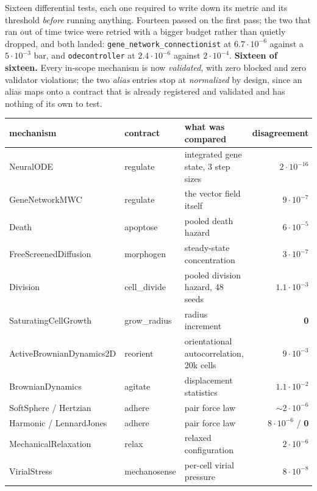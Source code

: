 \documentclass[11pt,a4paper]{article}
\newcommand{\code}[1]{\texttt{#1}}
\begin{document}
Sixteen differential tests, each one required to write down its metric and its threshold
\emph{before} running anything. Fourteen passed on the first pass; the two that ran out of time
twice were retried with a bigger budget rather than quietly dropped, and both landed:
\code{gene\_network\_connectionist} at $6.7{\cdot}10^{-6}$ against a $5{\cdot}10^{-3}$ bar, and
\code{odecontroller} at $2.4{\cdot}10^{-6}$ against $2{\cdot}10^{-4}$. \textbf{Sixteen of
sixteen.} Every in-scope mechanism is now \emph{validated}, with zero blocked and zero validator
violations; the two \emph{alias} entries stop at \emph{normalized} by design, since an alias maps
onto a contract that is already registered and validated and has nothing of its own to test.

\begin{center}
\footnotesize
\begin{tabular}{@{}l l l r@{}}
\toprule
\textbf{mechanism} & \textbf{contract} & \textbf{what was compared} & \textbf{disagreement}\\
\midrule
NeuralODE & regulate & integrated gene state, 3 step sizes & $2{\cdot}10^{-16}$\\
GeneNetworkMWC & regulate & the vector field itself & $9{\cdot}10^{-7}$\\
Death & apoptose & pooled death hazard & $6{\cdot}10^{-5}$\\
FreeScreenedDiffusion & morphogen & steady-state concentration & $3{\cdot}10^{-7}$\\
Division & cell\_divide & pooled division hazard, 48 seeds & $1.1{\cdot}10^{-3}$\\
SaturatingCellGrowth & grow\_radius & radius increment & \textbf{0}\\
ActiveBrownianDynamics2D & reorient & orientational autocorrelation, 20k cells & $9{\cdot}10^{-3}$\\
BrownianDynamics & agitate & displacement statistics & $1.1{\cdot}10^{-2}$\\
SoftSphere / Hertzian & adhere & pair force law & $\sim\!2{\cdot}10^{-6}$\\
Harmonic / LennardJones & adhere & pair force law & $8{\cdot}10^{-6}$ / \textbf{0}\\
MechanicalRelaxation & relax & relaxed configuration & $2{\cdot}10^{-6}$\\
VirialStress & mechanosense & per-cell virial pressure & $8{\cdot}10^{-8}$\\
\bottomrule
\end{tabular}
\end{center}
\end{document}
